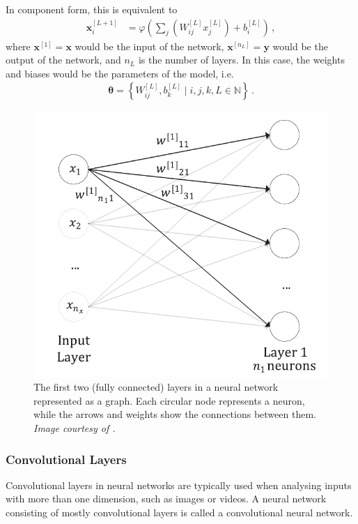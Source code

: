 \documentclass[11pt,a4paper,onecolumn]{report}
\begin{document}
\noindent In component form, this is equivalent to
\begin{align}
  \label{eqn:component_repr}
  \bm{x}^{[L+1]}_i
  &= \varphi \left(\sum\limits_j \left(W^{[L]}_{ij}x^{[L]}_j\right) + b^{[L]}_i\right)\,,
\end{align}
where \(\bm{x}^{[1]} = \bm{x}\) would be the input of the network,
\(\bm{x}^{[n_L]} = \bm{y}\) would be the output of the network, and \(n_L\) is
the number of layers. In this case, the weights and biases would be the
parameters of the model, i.e.
\begin{align*}
  \bm{\theta} = \left\{W_{ij}^{[L]}, b_{k}^{[L]} \mid i, j, k, L \in \mathbb{N} \right\}\,.
\end{align*}

\begin{figure}[t]
  \centering
  \includegraphics[width=0.5\linewidth]{ann.png}
  \caption{The first two (fully connected) layers in a neural network
  represented as a graph. Each circular node represents a neuron, while the
  arrows and weights show the connections between them. \textit{Image courtesy
  of \citet{michelucci2018}.}}
  \label{fig:fully_connected}
\end{figure}

\subsubsection{Convolutional Layers}
\label{sec:convolutional}
Convolutional layers in neural networks are typically used when analysing inputs
with more than one dimension, such as images or videos. A neural network
consisting of mostly convolutional layers is called a convolutional neural
network. \\
\end{document}
